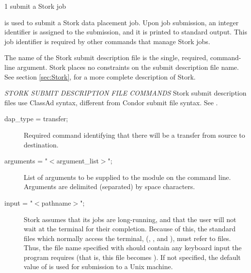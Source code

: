 \begin{ManPage}{\label{man-stork-submit}}{1}
{submit a Stork job}
\Synopsis {}
\ToolArgsBase

\Storkname
{}



\Description 

 is used to submit a Stork data placement job.
Upon job submission, an integer identifier is assigned to the
submission,
	and it is printed to standard output.
This job identifier is required by other commands
that manage Stork jobs.

The name of the Stork submit description file is the single,
required, command-line argument.
Stork places no constraints on the submit
description file name.
See section \ref{sec:Stork}, for a more 
complete description of Stork.

\emph{STORK SUBMIT DESCRIPTION FILE COMMANDS}
Stork submit description files use ClassAd syntax, different from Condor submit
file syntax.  See .

\begin{description}

\item[dap\_type = transfer;]
Required command identifying that there will be
a transfer from source to destination.


\item[arguments = "$<$argument\_list$>$";]
List of arguments to be supplied
to the module on the command line.
Arguments are delimited (separated) by space characters.


\item[input = "$<$pathname$>$";]
Stork assumes that its jobs are
long-running, and that the user will not wait at the terminal for their
completion. Because of this, the standard files which normally access
the terminal, (, , and ),
must refer to files. Thus,
the file name specified with  should contain any keyboard
input the program requires (that is, this file becomes ).
If not specified, the default value
of  is used for submission to a Unix machine.


\end{description}
\end{ManPage}

